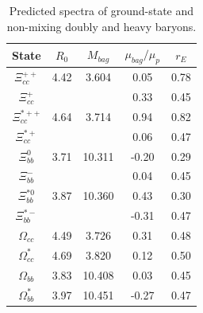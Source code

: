 \documentclass[prd,twocolumn,floatfix,nofootinbib]{revtex4}
\begin{document}
\renewcommand{\tabcolsep}{0.51cm} \renewcommand{\arraystretch}{1.3}
\begin{table}[!htb]
\caption{Predicted spectra of ground-state and non-mixing doubly and heavy
baryons.}
\label{tab:2heavybaryon}%
\begin{tabular}{ccccc}
\hline\hline
\textrm{State} & $R_{0}$ & $M_{bag}$ & $\mu_{bag}/\mu_{p}$ & $r_{E}$ \\
\hline
$\Xi_{cc}^{++}$ & 4.42 & 3.604 & 0.05 & 0.78 \\
$\Xi_{cc}^{+}$ &  &  & 0.33 & 0.45 \\
$\Xi_{cc}^{\ast ++}$ & 4.64 & 3.714 & 0.94 & 0.82 \\
$\Xi_{cc}^{\ast +}$ &  &  & 0.06 & 0.47 \\
$\Xi_{bb}^{0}$ & 3.71 & 10.311 & -0.20 & 0.29 \\
$\Xi_{bb}^{-}$ &  &  & 0.04 & 0.45 \\
$\Xi_{bb}^{\ast 0}$ & 3.87 & 10.360 & 0.43 & 0.30 \\
$\Xi_{bb}^{\ast -}$ &  &  & -0.31 & 0.47 \\
$\Omega_{cc}$ & 4.49 & 3.726 & 0.31 & 0.48 \\
$\Omega_{cc}^{\ast}$ & 4.69 & 3.820 & 0.12 & 0.50 \\
$\Omega_{bb}$ & 3.83 & 10.408 & 0.03 & 0.45 \\
$\Omega_{bb}^{\ast}$ & 3.97 & 10.451 & -0.27 & 0.47 \\ \hline\hline
\end{tabular}%
\end{table}
\end{document}
